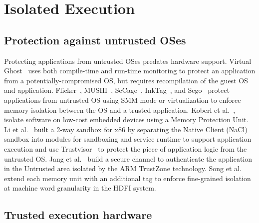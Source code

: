 \section{Isolated Execution}
\label{sec:related:sgx}

%
%
%


\subsection{Protection against untrusted OSes}

Protecting applications from untrusted OSes predates hardware support. 
Virtual Ghost~\cite{criswell2014virtualghost} uses both compile-time and run-time monitoring to protect an application
from a potentially-compromised OS, but requires recompilation of the guest OS and application.
Flicker~\cite{flicker}, MUSHI~\cite{zhang2012mushi}, SeCage~\cite{liu15secage}, InkTag~\cite{inktag}, and Sego~\cite{kwon16sego-sigops} protect applications from untrusted OS using SMM mode or virtualization
to enforce memory isolation between the OS and a trusted application.
Koberl et al.~\cite{koeberl2014trustlite}, isolate software on low-cost embedded devices using a Memory Protection Unit.
Li et al.~\cite{li2014minibox} built a 2-way sandbox for x86 by separating the Native Client (NaCl)~\cite{yee2009native} sandbox into modules for sandboxing and service runtime to support application execution and use Trustvisor~\cite{trustvisor} to protect the piece of application logic from the untrusted OS.
Jang et al.~\cite{jang2015secret} build a secure channel to authenticate the application in the Untrusted area isolated by the ARM TrustZone technology.
Song et al.~\cite{songhdfi} extend each memory unit with an additional tag
to enforce fine-grained isolation at machine word granularity in the HDFI system.

\subsection{Trusted execution hardware}

